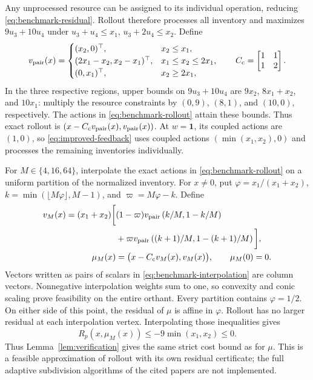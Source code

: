 \documentclass[10pt]{article}
\newcommand{\one}{\mathbf 1}
\begin{document}
Any unprocessed resource can be assigned to its individual operation, reducing \eqref{eq:benchmark-residual}. Rollout therefore processes all inventory and maximizes $9u_3+10u_4$ under $u_3+u_4\le x_1$, $u_3+2u_4\le x_2$. Define
\begin{equation}
 v_{\rm pair}(x)=
 \begin{cases}
 (x_2,0)^\top,&x_2\le x_1,\\
 (2x_1-x_2,x_2-x_1)^\top,&x_1\le x_2\le2x_1,\\
 (0,x_1)^\top,&x_2\ge2x_1,
 \end{cases}
 \qquad C_{\rm c}=\begin{bmatrix}1&1\\1&2\end{bmatrix}.
 \label{eq:benchmark-rollout}
\end{equation}
In the three respective regions, upper bounds on $9u_3+10u_4$ are $9x_2$, $8x_1+x_2$, and $10x_1$: multiply the resource constraints by $(0,9)$, $(8,1)$, and $(10,0)$, respectively. The actions in \eqref{eq:benchmark-rollout} attain these bounds. Thus exact rollout is $(x-C_{\rm c}v_{\rm pair}(x),v_{\rm pair}(x))$. At $w=\one$, its coupled actions are $(1,0)$, so \eqref{eq:improved-feedback} uses coupled actions $(\min(x_1,x_2),0)$ and processes the remaining inventories individually.

For $M\in\{4,16,64\}$, interpolate the exact actions in \eqref{eq:benchmark-rollout} on a uniform partition of the normalized inventory. For $x\ne0$, put $\varphi=x_1/(x_1+x_2)$, $k=\min(\lfloor M\varphi\rfloor,M-1)$, and $\varpi=M\varphi-k$. Define
\begin{equation}
 \begin{split}
 v_M(x)=(x_1+x_2)\bigg[&(1-\varpi)v_{\rm pair}\left(k/M,1-k/M\right)\\
 &+\varpi v_{\rm pair}\left((k+1)/M,1-(k+1)/M\right)\bigg],\\
 \mu_M(x)&=\bigl(x-C_{\rm c}v_M(x),v_M(x)\bigr),\qquad \mu_M(0)=0.
 \end{split}
 \label{eq:benchmark-interpolation}
\end{equation}
Vectors written as pairs of scalars in \eqref{eq:benchmark-interpolation} are column vectors. Nonnegative interpolation weights sum to one, so convexity and conic scaling prove feasibility on the entire orthant. Every partition contains $\varphi=1/2$. On either side of this point, the residual of $\mu$ is affine in $\varphi$. Rollout has no larger residual at each interpolation vertex. Interpolating those inequalities gives
\begin{equation}
 R_p(x,\mu_M(x))\le-9\min(x_1,x_2)\le0.
 \label{eq:benchmark-interpolation-certificate}
\end{equation}
Thus Lemma~\ref{lem:verification} gives the same strict cost bound as for $\mu$. This is a feasible approximation of rollout with its own residual certificate; the full adaptive subdivision algorithms of the cited papers are not implemented.
\end{document}
